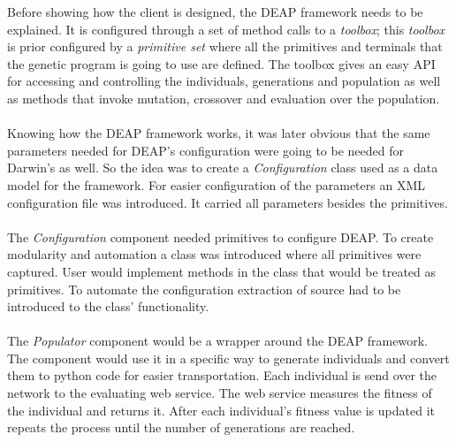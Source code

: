 Before showing how the client is designed, the DEAP framework needs to be explained. It is configured through a set of method calls
to a \textit{toolbox}; this \textit{toolbox} is prior configured by a \textit{primitive set} where all the primitives and 
terminals that the genetic program is going to use are defined. The toolbox gives an easy API for accessing and controlling the individuals,
generations and population as well as methods that invoke mutation, crossover and evaluation over the population.
\paragraph{}
Knowing how the DEAP framework works, it was later obvious that the same parameters needed for DEAP's configuration
were going to be needed for Darwin's as well. So the idea was to create a \textit{Configuration} class used as a data
model for the framework. For easier configuration of the parameters an XML configuration file was introduced. It carried
all parameters besides the primitives.
\paragraph{}
The \textit{Configuration} component needed primitives to configure DEAP. To create modularity and automation a class was introduced
where all primitives were captured. User would implement methods in the class that would be treated as primitives. To
automate the configuration extraction of source had to be introduced to the class' functionality.
\paragraph{}
The \textit{Populator} component would be a wrapper around the DEAP framework. 
The component would use it in a specific way to generate individuals and convert them to python code for easier transportation.
 Each individual is send over the network to the evaluating web service. The web service measures the fitness
of the individual and returns it. After each individual's fitness value is updated it
repeats the process until the number of generations are reached.

